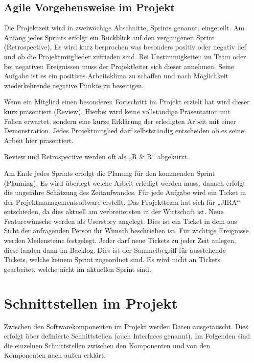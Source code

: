 \section{Agile Vorgehensweise im Projekt}
\label{sec:agile_vorgehensweise}
Die Projektzeit wird in zweiwöchige Abschnitte, Sprints genannt, eingeteilt. Am
Anfang jedes Sprints erfolgt ein Rückblick auf den vergangenen Sprint
(Retrospective). Es wird kurz besprochen was besonders positiv oder negativ
lief und ob die Projektmitglieder zufrieden sind. Bei Unstimmigkeiten im Team
oder bei negativen Ereignissen muss der Projektleiter sich dieser annehmen.
Seine Aufgabe ist es ein positives Arbeitsklima zu schaffen und nach
Möglichkeit wiederkehrende negative Punkte zu beseitigen.

Wenn ein Mitglied einen besonderen Fortschritt im Projekt erzielt hat wird
dieser kurz präsentiert (Review). Hierbei wird keine vollständige Präsentation
mit Folien erwartet, sondern eine kurze Erklärung der erledigten Arbeit mit
einer Demonstration. Jedes Projektmitglied darf selbstständig entscheiden ob es
seine Arbeit hier präsentiert.

Review und Retrospective werden oft als „R \& R“ abgekürzt.

Am Ende jedes Sprints erfolgt die Planung für den kommenden Sprint (Planning).
Es wird überlegt welche Arbeit erledigt werden muss, danach erfolgt die
ungefähre Schätzung des Zeitaufwandes. Für jede Aufgabe wird ein Ticket in der
Projektmanagementsoftware erstellt. Das Projektteam hat sich für „JIRA“
entschieden, da dies aktuell am verbreitetsten in der Wirtschaft ist. Neue
Featurewünsche werden als Userstory angelegt. Dies ist ein Ticket in dem aus
Sicht der anfragenden Person ihr Wunsch beschrieben ist. Für wichtige
Ereignisse werden Meilensteine festgelegt. Jeder darf neue Tickets zu jeder
Zeit anlegen, diese landen dann im \gls{Backlog}. Dies ist der Sammelbegriff für
ausstehende Tickets, welche keinem Sprint zugeordnet sind. Es wird nicht an
Tickets gearbeitet, welche nicht im aktuellen Sprint sind.
\tm%

\chapter{Schnittstellen im Projekt}
Zwischen den Softwarekomponenten im Projekt werden Daten ausgetauscht. Dies
erfolgt über definierte Schnittstellen (auch Interfaces genannt). Im Folgenden
sind die einzelnen Schnittstellen zwischen den Komponenten und von den
Komponenten nach außen erklärt.
\tm%

